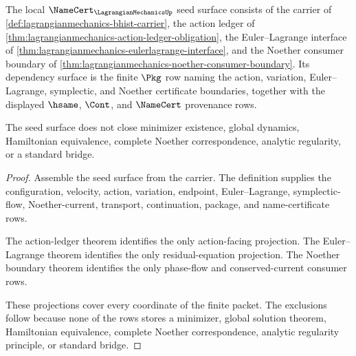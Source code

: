 \begin{theorem}
\label{thm:lagrangianmechanics-namecert-obligation-surface}
The local $\NameCert_{\LagrangianMechanicsUp}$ seed surface consists of the
carrier of \autoref{def:lagrangianmechanics-bhist-carrier}, the action ledger
of \autoref{thm:lagrangianmechanics-action-ledger-obligation}, the
Euler--Lagrange interface of
\autoref{thm:lagrangianmechanics-eulerlagrange-interface}, and the Noether
consumer boundary of
\autoref{thm:lagrangianmechanics-noether-consumer-boundary}. Its dependency
surface is the finite $\Pkg$ row naming the action, variation,
Euler--Lagrange, symplectic, and Noether certificate boundaries, together
with the displayed $\hsame$, $\Cont$, and $\NameCert$ provenance rows.

The seed surface does not close minimizer existence, global dynamics,
Hamiltonian equivalence, complete Noether correspondence, analytic regularity,
or a standard bridge.
\end{theorem}
\begin{proof}
Assemble the seed surface from the carrier. The definition supplies the
configuration, velocity, action, variation, endpoint, Euler--Lagrange,
symplectic-flow, Noether-current, transport, continuation, package, and
name-certificate rows.

The action-ledger theorem identifies the only action-facing projection. The
Euler--Lagrange theorem identifies the only residual-equation projection. The
Noether boundary theorem identifies the only phase-flow and conserved-current
consumer rows.

These projections cover every coordinate of the finite packet. The exclusions
follow because none of the rows stores a minimizer, global solution theorem,
Hamiltonian equivalence, complete Noether correspondence, analytic regularity
principle, or standard bridge.
\end{proof}

